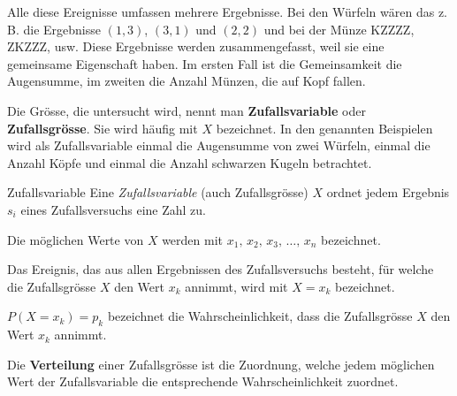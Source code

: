 Alle diese Ereignisse umfassen mehrere Ergebnisse. Bei den Würfeln wären das z.\,B. die Ergebnisse \((1,3)\), \((3,1)\) und \((2,2)\) und bei der Münze KZZZZ, ZKZZZ, usw. Diese Ergebnisse werden zusammengefasst, weil sie eine gemeinsame Eigenschaft haben. Im ersten Fall ist die Gemeinsamkeit die Augensumme, im zweiten die Anzahl Münzen, die auf Kopf fallen.


Die Grösse, die untersucht wird, nennt man \textbf{Zufallsvariable} oder \textbf{Zufallsgrösse}.
Sie wird häufig mit \( X \) bezeichnet.
In den genannten Beispielen wird als Zufallsvariable einmal die Augensumme von zwei Würfeln, einmal die Anzahl Köpfe und einmal die Anzahl schwarzen Kugeln betrachtet.

\begin{definition}
    {Zufallsvariable}{}
    Eine \textit{Zufallsvariable} (auch Zufallsgrösse) \( X \) ordnet jedem Ergebnis \( s_i \) eines Zufallsversuchs eine Zahl zu.

    Die möglichen Werte von \( X \) werden mit \( x_1,\, x_2,\, x_3,\, \ldots,\, x_n \) bezeichnet.

    \medskip

    Das Ereignis, das aus allen Ergebnissen des Zufallsversuchs besteht, für welche die Zufallsgrösse \( X \) den Wert \( x_k \) annimmt, wird mit \( X = x_k \) bezeichnet.


    \(
    P(X = x_k) = p_k
    \)
    bezeichnet die Wahrscheinlichkeit, dass die Zufallsgrösse \( X \) den Wert \( x_k \) annimmt.

\end{definition}

\medskip

Die \textbf{Verteilung} einer Zufallsgrösse ist die Zuordnung, welche jedem möglichen Wert der Zufallsvariable die entsprechende Wahrscheinlichkeit zuordnet.

